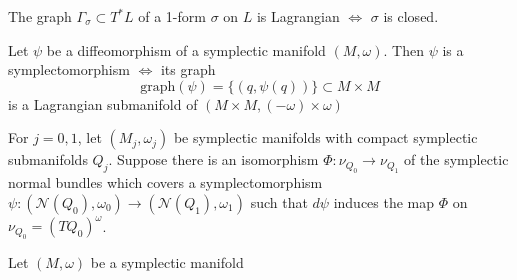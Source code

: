 \begin{prop}
The graph $\Gamma_{\sigma} \subset T^*L$ of a 1-form $\sigma$ on $L$ is Lagrangian $\iff$ $\sigma$ is closed.
\end{prop}

\begin{prop}
Let $\psi$ be a diffeomorphism of a symplectic manifold $(M,\omega)$. Then $\psi$ is a symplectomorphism $\iff$ its graph
\begin{equation}
    \mathrm{graph}(\psi)=\{(q,\psi(q))\} \subset M \times M
\end{equation}
is a Lagrangian submanifold of $(M \times M, (-\omega) \times \omega)$
\end{prop}

\begin{thm}
For $j=0,1$, let $(M_j,\omega_j)$ be symplectic manifolds with compact symplectic submanifolds $Q_j$. Suppose there is an isomorphism $\Phi: \nu_{Q_0} \to \nu_{Q_1}$ of the symplectic normal bundles which covers a symplectomorphism $\psi:(\mathcal{N}(Q_0),\omega_0) \to (\mathcal{N}(Q_1),\omega_1)$ such that $d\psi$ induces the map $\Phi$ on $\nu_{Q_0}=(TQ_0)^{\omega}$.
\end{thm}

\begin{thm}
Let $(M,\omega)$  be a symplectic manifold
\end{thm}







